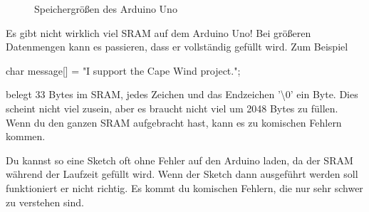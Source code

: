 \begin{figure}[h]
  \begin{center}
  \caption{Speichergrößen des Arduino Uno}
  \label{tab:speicher}
  \end{center}
\end{figure}
Es gibt nicht wirklich viel SRAM auf dem Arduino Uno! Bei größeren Datenmengen kann es passieren, dass er vollständig gefüllt wird. Zum Beispiel
\begin{arduinoCode}{}{}
char message[] = "I support the Cape Wind project.";
\end{arduinoCode}
belegt 33 Bytes im SRAM, jedes Zeichen und das Endzeichen '\textbackslash 0' ein Byte.
Dies scheint nicht viel zusein, aber es braucht nicht viel um 2048 Bytes zu füllen. Wenn du den ganzen SRAM aufgebracht hast, kann es zu komischen Fehlern kommen.

Du kannst so eine Sketch oft ohne Fehler auf den Arduino laden, da der SRAM während der Laufzeit gefüllt wird. Wenn der Sketch dann ausgeführt werden soll funktioniert er nicht richtig. Es kommt du komischen Fehlern, die nur sehr schwer zu verstehen sind.

